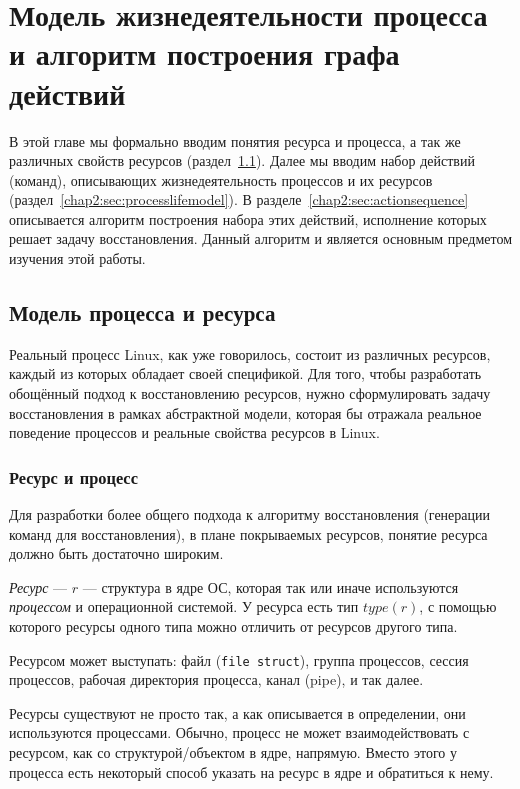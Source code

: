 
\chapter{Модель жизнедеятельности процесса и алгоритм построения графа действий}

В этой главе мы формально вводим понятия ресурса и процесса, а так же различных свойств ресурсов 
(раздел~\ref{chap2:sec:procresmodel}). Далее мы вводим набор действий (команд), описывающих жизнедеятельность 
процессов и их ресурсов (раздел~\ref{chap2:sec:processlifemodel}). В разделе~\ref{chap2:sec:actionsequence} 
описывается алгоритм построения набора этих действий, исполнение которых решает задачу восстановления. 
Данный алгоритм и является основным предметом изучения этой работы.

\section{Модель процесса и ресурса}
\label{chap2:sec:procresmodel}

Реальный процесс Linux, как уже говорилось, состоит из различных ресурсов, каждый из которых обладает своей 
спецификой. Для того, чтобы разработать обощённый подход к восстановлению ресурсов, нужно сформулировать задачу 
восстановления в рамках абстрактной модели, которая бы отражала реальное поведение процессов и реальные свойства 
ресурсов в Linux.

\subsection{Ресурс и процесс}

Для разработки более общего подхода к алгоритму восстановления (генерации команд для восстановления), в плане 
покрываемых ресурсов, понятие ресурса должно быть достаточно широким.

\begin{defn}
\label{def:resource}
\emph{Ресурс} --- $r$ --- структура в ядре ОС, которая так или иначе используются \emph{процессом} и операционной 
системой. У ресурса есть тип $type(r)$, с помощью которого ресурсы одного типа можно отличить от ресурсов другого типа.
\end{defn}

Ресурсом может выступать: файл (\texttt{file struct}), группа процессов, сессия процессов, рабочая директория 
процесса, канал (pipe), и так далее.

Ресурсы существуют не просто так, а как описывается в определении, они используются процессами. Обычно, процесс не 
может взаимодействовать с ресурсом, как со структурой/объектом в ядре, напрямую. Вместо этого у процесса есть 
некоторый способ указать на ресурс в ядре и обратиться к нему.

